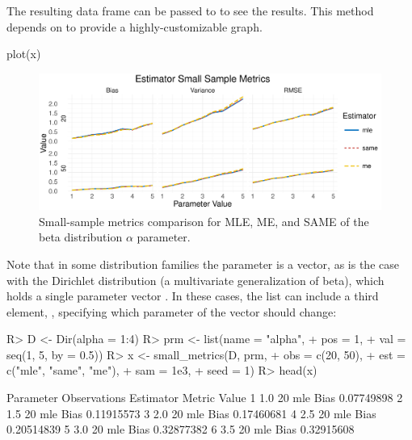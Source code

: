 \documentclass[nojss]{jss}
\newcommand{\fct}[1]{\code{#1()}}
\begin{document}
The resulting data frame can be passed to \fct{plot} to see the results. This \fct{plot} method depends on  to provide a highly-customizable graph.

\begin{CodeChunk}
\begin{CodeInput}
plot(x)
\end{CodeInput}
\end{CodeChunk}

\begin{figure}[t!]
\centering
\includegraphics{estim-vis_small_beta}
  \caption{\label{fig:vis-small-beta} Small-sample metrics comparison for MLE, ME, and SAME of the beta distribution $\alpha$ parameter.}
\end{figure}

Note that in some distribution families the parameter is a vector, as is the case with the Dirichlet distribution (a multivariate generalization of beta), which holds a single parameter vector . In these cases, the  list can include a third element, , specifying which parameter of the vector should change:

\begin{Schunk}
\begin{Sinput}
R> D <- Dir(alpha = 1:4)
R> prm <- list(name = "alpha",
+              pos = 1,
+              val = seq(1, 5, by = 0.5))
R> x <- small_metrics(D, prm,
+                     obs = c(20, 50),
+                     est = c("mle", "same", "me"),
+                     sam = 1e3,
+                     seed = 1)
R> head(x)
\end{Sinput}
\begin{Soutput}
  Parameter Observations Estimator Metric      Value
1       1.0           20       mle   Bias 0.07749898
2       1.5           20       mle   Bias 0.11915573
3       2.0           20       mle   Bias 0.17460681
4       2.5           20       mle   Bias 0.20514839
5       3.0           20       mle   Bias 0.32877382
6       3.5           20       mle   Bias 0.32915608
\end{Soutput}
\end{Schunk}
\end{document}
